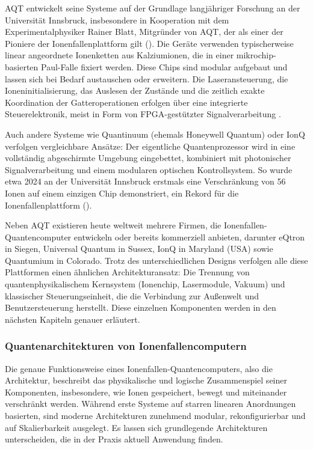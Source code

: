 AQT entwickelt seine Systeme auf der Grundlage langjähriger Forschung an der Universität Innsbruck, insbesondere in Kooperation mit dem Experimentalphysiker Rainer Blatt, Mitgründer von AQT, der als einer der Pioniere der Ionenfallenplattform gilt (\cite{blatt_entangled_2008}). Die Geräte verwenden typischerweise linear angeordnete Ionenketten aus Kalziumionen, die in einer mikrochip-basierten Paul-Falle fixiert werden. Diese Chips sind modular aufgebaut und lassen sich bei Bedarf austauschen oder erweitern. Die Laseransteuerung, die Ioneninitialisierung, das Auslesen der Zustände und die zeitlich exakte Koordination der Gatteroperationen erfolgen über eine integrierte Steuerelektronik, meist in Form von FPGA-gestützter Signalverarbeitung .

Auch andere Systeme wie Quantinuum (ehemals Honeywell Quantum) oder IonQ verfolgen vergleichbare Ansätze: Der eigentliche Quantenprozessor wird in eine vollständig abgeschirmte Umgebung eingebettet, kombiniert mit photonischer Signalverarbeitung und einem modularen optischen Kontrollsystem. So wurde etwa 2024 an der Universität Innsbruck erstmals eine Verschränkung von 56 Ionen auf einem einzigen Chip demonstriert, ein Rekord für die Ionenfallenplattform (\cite{bischoffWettkampfQubits2024}). 

Neben AQT existieren heute weltweit mehrere Firmen, die Ionenfallen-Quantencomputer entwickeln oder bereits kommerziell anbieten, darunter eQtron in Siegen, Universal Quantum in Sussex, IonQ in Maryland (USA) sowie Quantumium in Colorado. 
Trotz des unterschiedlichen Designs verfolgen alle diese Plattformen einen ähnlichen Architekturansatz: Die Trennung von quantenphysikalischem Kernsystem (Ionenchip, Lasermodule, Vakuum) und klassischer Steuerungseinheit, die die Verbindung zur Außenwelt und Benutzersteuerung herstellt. Diese einzelnen Komponenten werden in den nächsten Kapiteln genauer erläutert.

\subsubsection{Quantenarchitekturen von Ionenfallencomputern}
Die genaue Funktionsweise eines Ionenfallen-Quantencomputers, also die Architektur, beschreibt das physikalische und logische Zusammenspiel seiner Komponenten, insbesondere, wie Ionen gespeichert, bewegt und miteinander verschränkt werden. Während erste Systeme auf starren linearen Anordnungen basierten, sind moderne Architekturen zunehmend modular, rekonfigurierbar und auf Skalierbarkeit ausgelegt. Es lassen sich grundlegende Architekturen unterscheiden, die in der Praxis aktuell Anwendung finden.
\\\\

